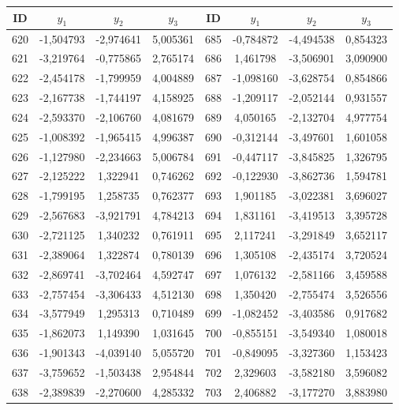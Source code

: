 \begin{apendicesenv}
\begin{table}[H]
	\centering
	\scriptsize
	\begin{tabular}{c c c c c c c c}
		\toprule
		 \centering \textbf{ID} & $y_1$ & $y_2$ & $y_3$ & \textbf{ID} & $y_1$ & $y_2$ & $y_3$ \\
		\midrule
		620 & -1,504793 & -2,974641 & 5,005361 & 685 & -0,784872 & -4,494538 & 0,854323 \\
		621 & -3,219764 & -0,775865 & 2,765174 & 686 & 1,461798 & -3,506901 & 3,090900 \\
		622 & -2,454178 & -1,799959 & 4,004889 & 687 & -1,098160 & -3,628754 & 0,854866 \\
		623 & -2,167738 & -1,744197 & 4,158925 & 688 & -1,209117 & -2,052144 & 0,931557 \\
		624 & -2,593370 & -2,106760 & 4,081679 & 689 & 4,050165 & -2,132704 & 4,977754 \\
		625 & -1,008392 & -1,965415 & 4,996387 & 690 & -0,312144 & -3,497601 & 1,601058 \\
		626 & -1,127980 & -2,234663 & 5,006784 & 691 & -0,447117 & -3,845825 & 1,326795 \\
		627 & -2,125222 & 1,322941 & 0,746262 & 692 & -0,122930 & -3,862736 & 1,594781 \\
		628 & -1,799195 & 1,258735 & 0,762377 & 693 & 1,901185 & -3,022381 & 3,696027 \\
		629 & -2,567683 & -3,921791 & 4,784213 & 694 & 1,831161 & -3,419513 & 3,395728 \\
		630 & -2,721125 & 1,340232 & 0,761911 & 695 & 2,117241 & -3,291849 & 3,652117 \\
		631 & -2,389064 & 1,322874 & 0,780139 & 696 & 1,305108 & -2,435174 & 3,720524 \\
		632 & -2,869741 & -3,702464 & 4,592747 & 697 & 1,076132 & -2,581166 & 3,459588 \\
		633 & -2,757454 & -3,306433 & 4,512130 & 698 & 1,350420 & -2,755474 & 3,526556 \\
		634 & -3,577949 & 1,295313 & 0,710489 & 699 & -1,082452 & -3,403586 & 0,917682 \\
		635 & -1,862073 & 1,149390 & 1,031645 & 700 & -0,855151 & -3,549340 & 1,080018 \\
		636 & -1,901343 & -4,039140 & 5,055720 & 701 & -0,849095 & -3,327360 & 1,153423 \\
		637 & -3,759652 & -1,503438 & 2,954844 & 702 & 2,329603 & -3,582180 & 3,596082 \\
		638 & -2,389839 & -2,270600 & 4,285332 & 703 & 2,406882 & -3,177270 & 3,883980 \\

\end{tabular}
\end{table}
\end{apendicesenv}
